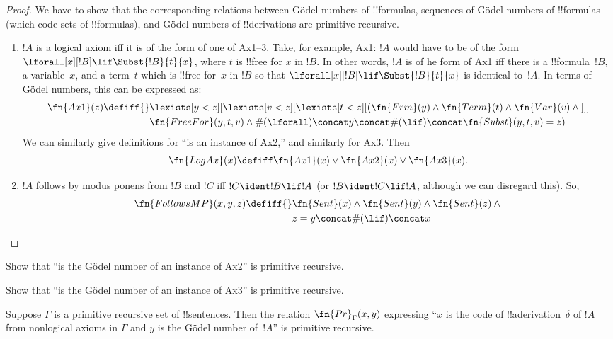 \documentclass[../../../include/open-logic-section]{subfiles}
\begin{document}
\begin{proof}
We have to show that the corresponding relations between G\"odel
numbers of !!{formula}s, sequences of G\"odel numbers of !!{formula}s
(which code sets of !!{formula}s), and G\"odel numbers of !!{derivation}s 
are primitive recursive.
\begin{enumerate}
\item $!A$ is a logical axiom iff it is of the form of one of Ax1--3.
  Take, for example, Ax1: $!A$ would have to be of the form
  $\lforall[x][!B] \lif \Subst{!B}{t}{x}$, where $t$ is !!{free for}
  $x$ in $!B$. In other words, $!A$ is of he form of Ax1 iff there is
  a !!{formula}~$!B$, a variable~$x$, and a term~$t$ which is !!{free
    for}~$x$ in $!B$ so that $\lforall[x][!B] \lif \Subst{!B}{t}{x}$
  is identical to~$!A$. In terms of G\"odel numbers, this can be
  expressed as:
  \begin{align*}
    \fn{Ax1}(z) \defiff {} & \lexists[y<z][\lexists[v<z][\lexists[t<z][(
          \fn{Frm}(y) \land \fn{Term}(t) \land \fn{Var}(v)  \land {} ]]] \\
    & \fn{FreeFor}(y,t,v) \land
    \#(\lforall) \concat y \concat \#(\lif) \concat \fn{Subst}(y,t,v) = z)
  \end{align*}
  We can similarly give definitions for ``is an instance of Ax2,'' and
  similarly for Ax3.  Then
  \[
  \fn{LogAx}(x) \defiff \fn{Ax1}(x) \lor \fn{Ax2}(x) \lor \fn{Ax3}(x).
  \]
\item $!A$ follows by modus ponens from $!B$ and $!C$ iff $!C \ident
  !B \lif !A$ (or $!B \ident !C \lif !A$, although we can disregard
  this). So,
  \begin{align*}
    \fn{FollowsMP}(x, y, z) \defiff {} &
      \fn{Sent}(x) \land \fn{Sent}(y) \land\fn{Sent}(z) \land {}\\
      & z = y \concat \#(\lif) \concat x 
    \end{align*}
\end{enumerate}
\end{proof}

\begin{prob}
  Show that ``is the G\"odel number of an instance of Ax2'' is
  primitive recursive.
\end{prob}

\begin{prob}
  Show that ``is the G\"odel number of an instance of Ax3'' is
  primitive recursive.
\end{prob}

\begin{prop}
Suppose $\Gamma$ is a primitive recursive set of !!{sentence}s.  Then
the relation $\fn{Pr}_\Gamma(x, y)$ expressing ``$x$ is the code of
!!a{derivation}~$\delta$ of $!A$ from nonlogical axioms in $\Gamma$
and $y$ is the G\"odel number of~$!A$'' is
primitive recursive.
\end{prop}
\end{document}
